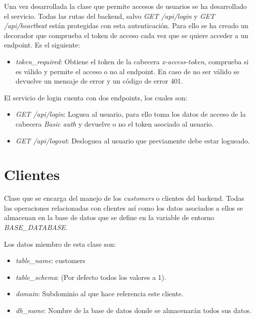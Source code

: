 \bigskip
Una vez desarrollada la clase que permite accesos de usuarios se ha desarrollado el servicio. Todas las rutas del backend, salvo \textit{GET /api/login} y \textit{GET /api/heartbeat} están protegidas con esta autenticación. Para ello se ha creado un decorador que comprueba el token de acceso cada vez que se quiere acceder a un endpoint. Es el siguiente:
\begin{itemize}
	\item \textit{token\_required}: Obtiene el token de la cabecera \textit{x-access-token}, comprueba si es válido y permite el acceso o no al endpoint. En caso de no ser válido se devuelve un mensaje de error y un código de error 401.
\end{itemize}


\bigskip
El servicio de login cuenta con dos endpoints, los cuales son:
\begin{itemize}
	\item \textit{GET /api/login}: Loguea al usuario, para ello toma los datos de acceso de la cabecera \textit{Basic auth} y devuelve o no el token asociado al usuario.
	\item \textit{GET /api/logout}: Desloguea al usuario que previamente debe estar logueado.
\end{itemize}




\section{Clientes}

Clase que se encarga del manejo de los \textit{customers} o clientes del backend. Todas las operaciones relacionadas con clientes así como los datos asociados a ellos se almacenan en la base de datos que se define en la variable de entorno \textit{BASE\_DATABASE}.

\bigskip
Los datos miembro de esta clase son:
\begin{itemize}
	\item \textit{table\_name}: customers
	\item \textit{table\_schema}: (Por defecto todos los valores a 1).
	\item \textit{domain}: Subdominio al que hace referencia este cliente.
	\item \textit{db\_name}: Nombre de la base de datos donde se almacenarán todos sus datos.
\end{itemize}


